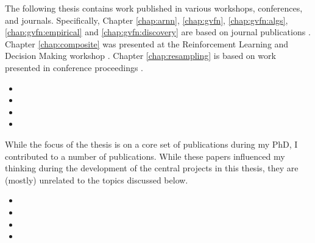 \documentclass[\main/thesis.tex]{subfiles}
\begin{document}
\begin{preface}

The following thesis contains work published in various workshops, conferences, and journals.
Specifically, Chapter \ref{chap:arnn}, \ref{chap:gvfn}, \ref{chap:gvfn:algs}, \ref{chap:gvfn:empirical} and \ref{chap:gvfn:discovery} are based on journal publications \parencite{schlegel2021general, schlegel2022investigating}. Chapter \ref{chap:composite} was presented at the Reinforcement Learning and Decision Making workshop \parencite{schlegel2022predictions}. Chapter \ref{chap:resampling} is based on work presented in conference proceedings \parencite{schlegel2019importance}.

\begin{itemize}
\item[] 
\item[] 
\item[] 
\item[] 
\end{itemize}

While the focus of the thesis is on a core set of publications during
my PhD, I contributed to a number of publications. While these papers
influenced my thinking during the development of the central projects
in this thesis, they are (mostly) unrelated to the topics discussed
below.

\begin{itemize}
\item[] 
\item[] 
\item[] 
\item[] 
\end{itemize}

\end{preface}
\end{document}
